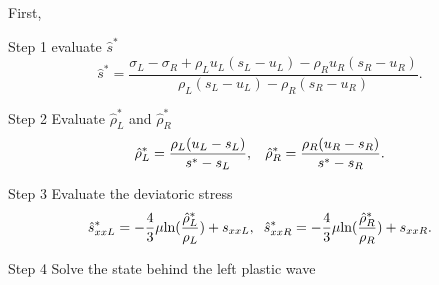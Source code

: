 \documentclass{article}
\numberwithin{equation}{section}
\numberwithin{table}{section}
\begin{document}
First,

Step 1 evaluate  $\hat{s}^*$
\begin{equation*}
  \hat{s}^* = \frac{\sigma_L-\sigma_R+\rho_L u_L(s_L-u_L)-\rho_R u_R(s_R-u_R)}{\rho_L(s_L-u_L)-\rho_R(s_R-u_R)}.
\end{equation*}

Step 2  Evaluate  $\hat{\rho}_L^*$ and $\hat{\rho}_R^*$
\begin{equation*}
  \hat{\rho}_L^* = \frac{\rho_L(u_L-s_L)}{s^*-s_L}, \hspace{0.3cm}  \hat{\rho}_R^* = \frac{\rho_R(u_R-s_R)}{s^*-s_R}.
\end{equation*}

Step 3  Evaluate  the deviatoric stress
\begin{equation*}
  \hat{s}_{xxL}^*=-\frac{4}{3}\mu\text{ln}(\frac{\hat{\rho}_L^*}{\rho_L})+s_{xxL},\hspace{0.2cm}  \hat{s}_{xxR}^*=-\frac{4}{3}\mu\text{ln}(\frac{\hat{\rho}_R^*}{\rho_R})+s_{xxR}.
\end{equation*}

Step 4 Solve the state behind the left  plastic wave
\end{document}
